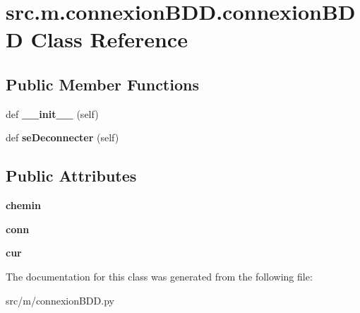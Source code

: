 \hypertarget{classsrc_1_1m_1_1connexion_b_d_d_1_1connexion_b_d_d}{}\section{src.\+m.\+connexion\+B\+D\+D.\+connexion\+B\+D\+D Class Reference}
\label{classsrc_1_1m_1_1connexion_b_d_d_1_1connexion_b_d_d}
\subsection*{Public Member Functions}
\begin{DoxyCompactItemize}
\item 
\hypertarget{classsrc_1_1m_1_1connexion_b_d_d_1_1connexion_b_d_d_a28b1578ff8f224102db6193b62f804ab}{}def {\bfseries \+\_\+\+\_\+init\+\_\+\+\_\+} (self)\label{classsrc_1_1m_1_1connexion_b_d_d_1_1connexion_b_d_d_a28b1578ff8f224102db6193b62f804ab}

\item 
\hypertarget{classsrc_1_1m_1_1connexion_b_d_d_1_1connexion_b_d_d_a925cbc1748284fdf495a943e3423a532}{}def {\bfseries se\+Deconnecter} (self)\label{classsrc_1_1m_1_1connexion_b_d_d_1_1connexion_b_d_d_a925cbc1748284fdf495a943e3423a532}

\end{DoxyCompactItemize}
\subsection*{Public Attributes}
\begin{DoxyCompactItemize}
\item 
\hypertarget{classsrc_1_1m_1_1connexion_b_d_d_1_1connexion_b_d_d_a8a041fb80d941f92e926517a3323af32}{}{\bfseries chemin}\label{classsrc_1_1m_1_1connexion_b_d_d_1_1connexion_b_d_d_a8a041fb80d941f92e926517a3323af32}

\item 
\hypertarget{classsrc_1_1m_1_1connexion_b_d_d_1_1connexion_b_d_d_acf9d6301c34c3cb855f9ef3124ba46e6}{}{\bfseries conn}\label{classsrc_1_1m_1_1connexion_b_d_d_1_1connexion_b_d_d_acf9d6301c34c3cb855f9ef3124ba46e6}

\item 
\hypertarget{classsrc_1_1m_1_1connexion_b_d_d_1_1connexion_b_d_d_a53e34be4bbdfb6364531ce376db0da76}{}{\bfseries cur}\label{classsrc_1_1m_1_1connexion_b_d_d_1_1connexion_b_d_d_a53e34be4bbdfb6364531ce376db0da76}

\end{DoxyCompactItemize}


The documentation for this class was generated from the following file\+:\begin{DoxyCompactItemize}
\item 
src/m/connexion\+B\+D\+D.\+py\end{DoxyCompactItemize}

